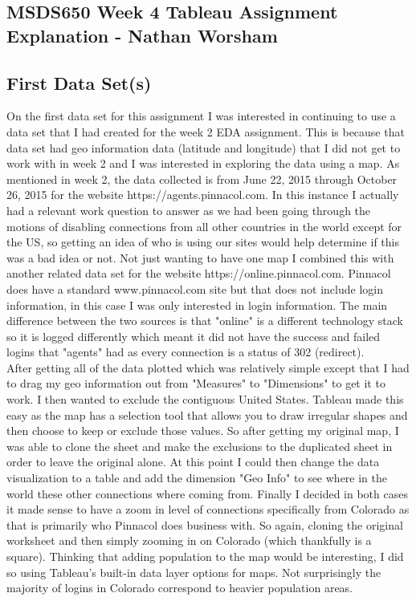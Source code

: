 \documentclass[10pt]{article}
\begin{document}
\subsection*{MSDS650 Week 4 Tableau Assignment Explanation - Nathan Worsham}
\subsection*{First Data Set(s)}
On the first data set for this assignment I was interested in continuing to use a data set that I had created for the week 2 EDA assignment. This is because that data set had geo information data (latitude and longitude) that I did not get to work with in week 2 and I was interested in exploring the data using a map. As mentioned in week 2, the data collected is from June 22, 2015 through October 26, 2015 for the website https://agents.pinnacol.com. In this instance I actually had a relevant work question to answer as we had been going through the motions of disabling connections from all other countries in the world except for the US, so getting an idea of who is using our sites would help determine if this was a bad idea or not. Not just wanting to have one map I combined this with another related data set for the website https://online.pinnacol.com. Pinnacol does have a standard www.pinnacol.com site but that does not include login information, in this case I was only interested in login information. The main difference between the two sources is that "online" is a different technology stack so it is logged differently which meant it did not have the success and failed logins that "agents" had as every connection is a status of 302 (redirect).\\
\indent After getting all of the data plotted which was relatively simple except that I had to drag my geo information out from "Measures" to "Dimensions" to get it to work. I then wanted to exclude the contiguous United States. Tableau made this easy as the map has a selection tool that allows you to draw irregular shapes and then choose to keep or exclude those values. So after getting my original map, I was able to clone the sheet and make the exclusions to the duplicated sheet in order to leave the original alone. At this point I could then change the data visualization to a table and add the dimension "Geo Info" to see where in the world these other connections where coming from. Finally I decided in both cases it made sense to have a zoom in level of connections specifically from Colorado as that is primarily who Pinnacol does business with. So again, cloning the original worksheet and then simply zooming in on Colorado (which thankfully is a square). Thinking that adding population to the map would be interesting, I did so using Tableau's built-in data layer options for maps. Not surprisingly the majority of logins in Colorado correspond to heavier population areas. 
\end{document}
